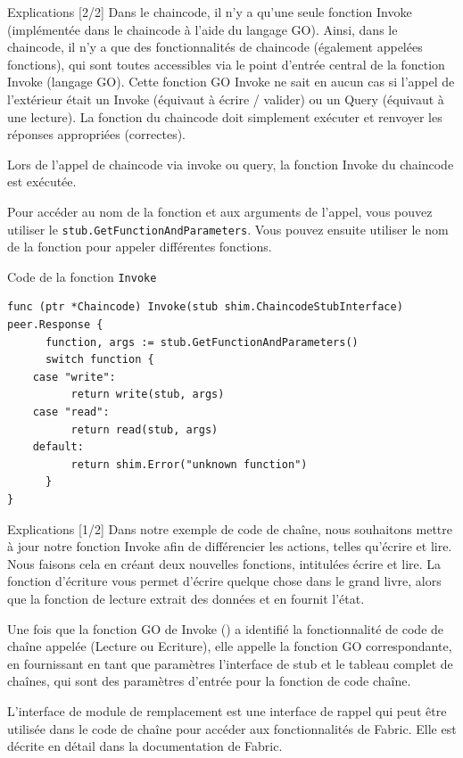 \documentclass[presentation]{beamer}
\begin{document}
\begin{frame}[fragile,label={sec:org020d50c}]{Explications [2/2]}
 Dans le chaincode, il n'y a qu'une seule fonction Invoke (implémentée dans le chaincode à l'aide du langage GO). 
Ainsi, dans le chaincode, il n'y a que des fonctionnalités de chaincode (également appelées fonctions), qui sont 
toutes accessibles via le point d'entrée central de la fonction Invoke (langage GO). 
Cette fonction GO Invoke ne sait en aucun cas si l'appel de l'extérieur était un Invoke (équivaut à écrire / valider) 
ou un Query (équivaut à une lecture). 
La fonction du chaincode doit simplement exécuter et renvoyer les réponses appropriées (correctes).

Lors de l'appel de chaincode via invoke ou query, la fonction Invoke du chaincode est exécutée. 

Pour accéder au nom de la fonction et aux arguments de l'appel, vous pouvez utiliser le \texttt{stub.GetFunctionAndParameters}. 
Vous pouvez ensuite utiliser le nom de la fonction pour appeler différentes fonctions.
\end{frame}

\begin{frame}[fragile,label={sec:org4e5d38c}]{Code de la fonction \texttt{Invoke}}
 \begin{verbatim}
func (ptr *Chaincode) Invoke(stub shim.ChaincodeStubInterface) peer.Response {
      function, args := stub.GetFunctionAndParameters()
      switch function {
	case "write":
	      return write(stub, args)  
	case "read":
	      return read(stub, args)
	default:
	      return shim.Error("unknown function")
      }
}
\end{verbatim}
\end{frame}
\begin{frame}[label={sec:org9ee9680}]{Explications [1/2]}
Dans notre exemple de code de chaîne, nous souhaitons mettre à jour notre fonction Invoke 
afin de différencier les actions, telles qu'écrire et lire. Nous faisons cela en créant 
deux nouvelles fonctions, intitulées écrire et lire. La fonction d'écriture vous permet 
d'écrire quelque chose dans le grand livre, alors que la fonction de lecture extrait des 
données et en fournit l'état.

Une fois que la fonction GO de Invoke () a identifié la fonctionnalité de code de chaîne 
appelée (Lecture ou Ecriture), elle appelle la fonction GO correspondante, en fournissant 
en tant que paramètres l'interface de stub et le tableau complet de chaînes, qui sont des 
paramètres d'entrée pour la fonction de code chaîne.

L'interface de module de remplacement est une interface de rappel qui peut être utilisée 
dans le code de chaîne pour accéder aux fonctionnalités de Fabric. Elle est décrite en 
détail dans la documentation de Fabric.
\end{frame}
\end{document}
